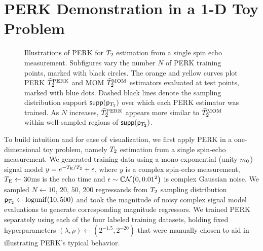 \section{PERK Demonstration in a 1-D Toy Problem}
\label{s,perk,demo}

\begin{figure}[!ht]
	\centering
	\hspace{0.3cm}
	
	\hspace{0.3cm}
	\caption{%
		Illustrations of PERK 
		for $T_2$ estimation
		from a single spin echo measurement.
		Subfigures vary the number $N$
		of PERK training points,
		marked with black circles.
		The orange and yellow curves plot
		PERK $\widehat{T}_2^{\mathrm{PERK}}$ and MOM $\widehat{T}_2^{\mathrm{MOM}}$ estimators
		evaluated at test points,
		marked with blue dots.
		Dashed black lines denote 
		the sampling distribution support $\supp{\dist{\Tt}}$
		over which each PERK estimator was trained.
		As $N$ increases,
		$\widehat{T}_2^{\mathrm{PERK}}$ appears more similar to $\widehat{T}_2^{\mathrm{MOM}}$
		within well-sampled regions
		of $\supp{\dist{\Tt}}$.
	}%
	\label{fig:perk,toy}
\end{figure}

To build intuition
and for ease of visualization,
we first apply PERK
in a one-dimensional toy problem,
namely $T_2$ estimation
from a single spin-echo measurement.
We generated training data
using a mono-exponential (unity-$m_0$) signal model
$y = e^{-T_\mathrm{E}/T_2} + \epsilon$,
where $y$ is a complex spin-echo measurement,
$T_\mathrm{E} \gets 30$ms is the echo time
and $\epsilon \sim \cgauss{0}{0.01^2}$ is complex Gaussian noise.
We sampled $N \gets 10$, $20$, $50$, $200$ regressands
from $T_2$ sampling distribution $\dist{\Tt} \gets \logunif{10,500}$
and took the magnitude 
of noisy complex signal model evaluations
to generate corresponding magnitude regressors.
We trained PERK separately
using each of the four labeled training datasets,
holding fixed hyperparameters $(\lambda,\rho) \gets (2^{-1.5},2^{-20})$
that were manually chosen
to aid in illustrating PERK's typical behavior.
	
